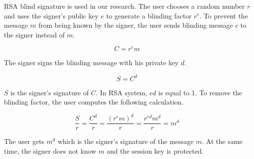 RSA blind signature\cite{cryptoNote} is used in our research. The user chooses a random number $r$ and uses the signer's public key $e$ to generate a blinding factor $r^e$. To prevent the message $m$ from being known by the signer, the user sends blinding message $c$ to the signer instead of $m$.

\begin{equation}
C = r^e m
\end{equation}

The signer signs the blinding message with his private key $d$.

\begin{equation}
S = C^d
\end{equation}

$S$ is the signer's signature of $C$. In RSA system, $ed$ is equal to 1. To remove the blinding factor, the user computes the following calculation.

\begin{equation}
\frac{S}{r}= \frac{C^d}{r} = \frac{(r^e m)^d}{r} = \frac{r^{ed} m^d}{r} = m^d
\end{equation}
 
The user gets $m^d$ which is the signer's signature of the message $m$. At the same time, the signer does not know $m$ and the session key is protected. 